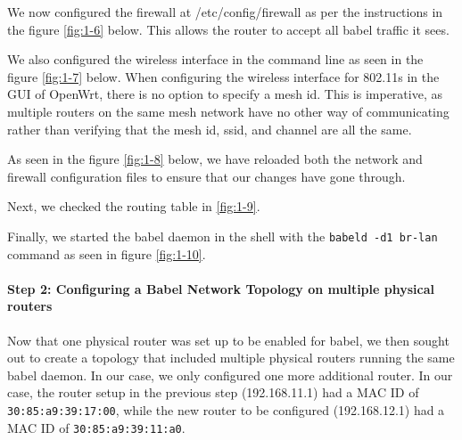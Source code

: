 \documentclass[main.tex]{subfiles}
\begin{document}

We now configured the firewall  at /etc/config/firewall as per the instructions in the figure \ref{fig:1-6} below. This allows the router to accept all babel traffic it sees.


We also configured the wireless interface in the command line as seen in the figure \ref{fig:1-7} below. When configuring the wireless interface for 802.11s in the GUI of OpenWrt, there is no option to specify a mesh id. This is imperative, as multiple routers on the same mesh network have no other way of communicating rather than verifying that the mesh id, ssid, and channel are all the same.


As seen in the figure \ref{fig:1-8} below, we have reloaded both the network and firewall configuration files to ensure that our changes have gone through.


Next, we checked the routing table in \ref{fig:1-9}.




Finally, we started the babel daemon in the shell with the \texttt{babeld -d1 br-lan} command as seen in figure \ref{fig:1-10}.




\paragraph{Step 2: Configuring a Babel Network Topology on multiple physical routers}
\hfill \break
Now that one physical router was set up to be enabled for babel, we then sought out to create a topology that included multiple physical routers running the same babel daemon. In our case, we only configured one more additional router. In our case, the router setup in the previous step (192.168.11.1) had a MAC ID of \texttt{30:85:a9:39:17:00}, while the new router to be configured (192.168.12.1) had a MAC ID of \texttt{30:85:a9:39:11:a0}.
\end{document}
